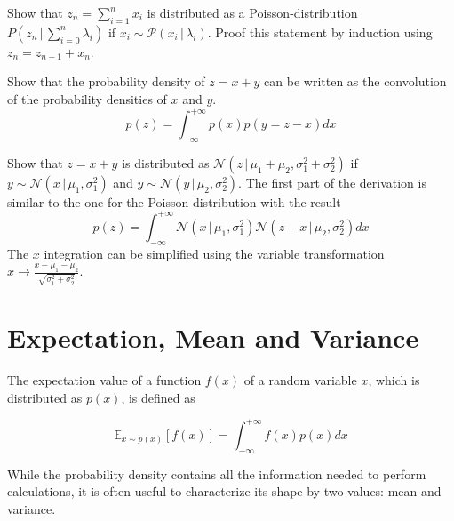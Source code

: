\documentclass{tstextbook}
\begin{document}
\begin{exercise}
   Show that $z_n=\sum_{i=1}^{n}x_i$ is distributed as a Poisson-distribution $P\left(z_n\,\vert\,\sum_{i=0}^n\lambda_i\right)$ if $x_i\sim \mathcal{P}(x_i\,\vert \,\lambda_i)$. Proof this statement by induction using $z_n=z_{n-1}+x_n$. 
\end{exercise}

\begin{exercise}
  Show that the probability density of $z=x+y$ can be written as the convolution of the probability densities of $x$ and $y$.
  \begin{equation}
    p(z)=\int_{-\infty}^{+\infty}p\left(x\right)
    p\left(y=z-x\right)dx
  \end{equation}
  
\end{exercise}

\begin{exercise}
  Show that $z=x+y$ is distributed as 
  $\mathcal{N}\left(z\,\vert\,\mu_1+\mu_2,\sigma_1^2+\sigma_2^2\right)$ if $y\sim \mathcal{N}(x\,\vert \,\mu_1,\sigma_1^2)$ and $y\sim \mathcal{N}(y\,\vert \,\mu_2,\sigma_2^2)$. The first part of the derivation is similar to the one for the Poisson distribution with the result
  \begin{equation}
    p(z)=\int_{-\infty}^{+\infty}\mathcal{N}\left(x\,\vert\,\mu_1,\sigma_1^2\right)
    \mathcal{N}\left(z-x\,\vert\,\mu_2,\sigma_2^2\right)dx
  \end{equation}
  The $x$ integration can be simplified using the variable transformation $x\rightarrow \frac{x-\mu_1-\mu_2}{\sqrt{\sigma_1^2+\sigma_2^2}}$.
\end{exercise}

\section{Expectation, Mean and Variance}

The expectation value of a function $f(x)$ of a random variable $x$, which is distributed as $p(x)$, is defined as
\begin{definition}[Expectation]
  \label{th:expectation}
  \begin{equation}
    \mathbb{E}_{x\sim p(x)}[f(x)]=\int_{-\infty}^{+\infty}f(x) p(x)dx
  \end{equation}
\end{definition}

While the probability density contains all the information needed to perform calculations, it is often useful to characterize its shape by two values: mean and variance.
\end{document}
